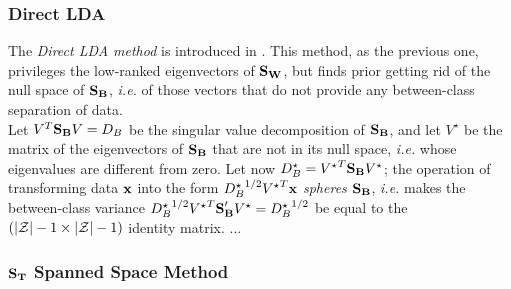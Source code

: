 \subsubsection{Direct LDA}
The {\em Direct LDA method} is introduced in \cite{Yu01adirect}. This method, as the previous one, privileges the low-ranked eigenvectors of $\textbf{S}_{\textbf{W}}$, but finds prior getting rid of the null space of $\textbf{S}_{\textbf{B}}$, \textit{i.e.} of those vectors that do not provide any between-class separation of data. \\
Let $V^T\textbf{S}_{\textbf{B}} V = D_B$ be the singular value decomposition of $\textbf{S}_{\textbf{B}}$, and let $V^\star$ be the matrix of the eigenvectors of $\textbf{S}_{\textbf{B}}$ that are not in its null space, \textit{i.e.} whose eigenvalues are different from zero. Let now $D_B^\star ={V^\star}^T\textbf{S}_{\textbf{B}} V^\star$; the operation of transforming data $\textbf{x}$ into the form ${D_B^\star}^{1/2}{V^\star}^T\textbf{x}$ {\em spheres} $\textbf{S}_{\textbf{B}}$, \textit{i.e.} makes the between-class variance ${D_B^\star}^{1/2}{V^\star}^T\textbf{S}_{\textbf{B}} ' V^\star ={D_B^\star}^{1/2} $ be equal to the $(\lvert \mathcal{Z} \rvert - 1 \times \lvert \mathcal{Z} \rvert - 1)$ identity matrix.
...


 
\subsubsection{$\textbf{S}_{\textbf{T}}$ Spanned Space Method}







